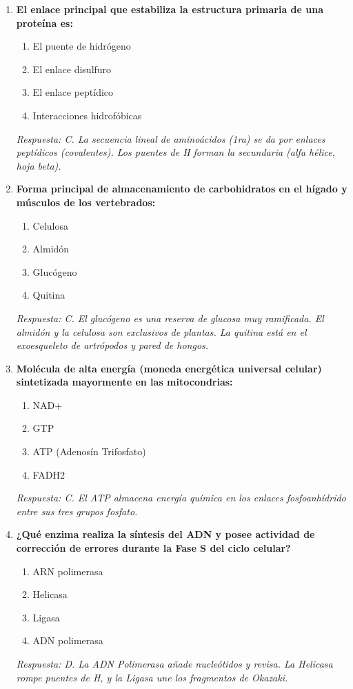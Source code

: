 \documentclass[spanish,letterpaper,oneside]{article}
\begin{document}
\begin{enumerate}[label=\textbf{\arabic*.}]
    \item \textbf{El enlace principal que estabiliza la estructura primaria de una proteína es:}
    \begin{enumerate}
        \item[A)] El puente de hidrógeno
        \item[B)] El enlace disulfuro
        \item[C)] El enlace peptídico
        \item[D)] Interacciones hidrofóbicas
    \end{enumerate}
    \textit{Respuesta: C. La secuencia lineal de aminoácidos (1ra) se da por enlaces peptídicos (covalentes). Los puentes de H forman la secundaria (alfa hélice, hoja beta).}

    \item \textbf{Forma principal de almacenamiento de carbohidratos en el hígado y músculos de los vertebrados:}
    \begin{enumerate}
        \item[A)] Celulosa
        \item[B)] Almidón
        \item[C)] Glucógeno
        \item[D)] Quitina
    \end{enumerate}
    \textit{Respuesta: C. El glucógeno es una reserva de glucosa muy ramificada. El almidón y la celulosa son exclusivos de plantas. La quitina está en el exoesqueleto de artrópodos y pared de hongos.}

    \item \textbf{Molécula de alta energía (moneda energética universal celular) sintetizada mayormente en las mitocondrias:}
    \begin{enumerate}
        \item[A)] NAD+
        \item[B)] GTP
        \item[C)] ATP (Adenosín Trifosfato)
        \item[D)] FADH2
    \end{enumerate}
    \textit{Respuesta: C. El ATP almacena energía química en los enlaces fosfoanhídrido entre sus tres grupos fosfato.}

    \item \textbf{¿Qué enzima realiza la síntesis del ADN y posee actividad de corrección de errores durante la Fase S del ciclo celular?}
    \begin{enumerate}
        \item[A)] ARN polimerasa
        \item[B)] Helicasa
        \item[C)] Ligasa
        \item[D)] ADN polimerasa
    \end{enumerate}
    \textit{Respuesta: D. La ADN Polimerasa añade nucleótidos y revisa. La Helicasa rompe puentes de H, y la Ligasa une los fragmentos de Okazaki.}


\end{enumerate}
\end{document}
